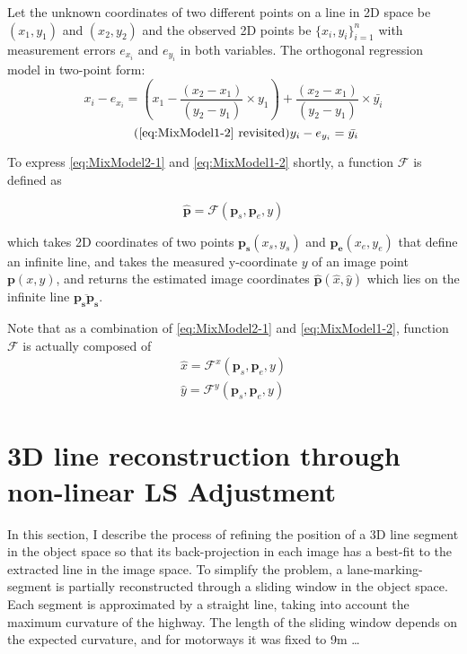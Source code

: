 Let the unknown coordinates of two different points on a line in 2D space be $(x_1,y_1)$ and $(x_2,y_2)$ and the observed 2D points be $\{x_i,y_i\}^n_{i=1}$ with measurement errors $e_{x_i}$ and $e_{y_i}$ in both variables. The orthogonal regression model in two-point form: 
\begin{equation} \label{eq:MixModel2-1}
x_i - e_{x_i}= (x_1-\dfrac{(x_2-x_1)}{(y_2-y_1)}\times y_1) + \dfrac{(x_2-x_1)}{(y_2-y_1)}\times \bar{y_i}
\end{equation}
\begin{equation} \tag{\ref{eq:MixModel1-2} revisited}
y_i-e_{y_i} = \bar{y_i}
\end{equation}

To express \eqref{eq:MixModel2-1} and \eqref{eq:MixModel1-2} shortly, a function $\mathcal{F}$ is defined as

\begin{equation} \label{eq:Ffunction}
\hat{\mathbf{p}} = \mathcal{F}(\mathbf{p}_s,\mathbf{p}_e,y)
\end{equation}

which takes 2D coordinates of two points $\mathbf{p_s}(x_s,y_s)$ and $\mathbf{p_e}(x_e,y_e)$ that define an infinite line, and takes the measured y-coordinate $y$ of an image point $\mathbf{p}(x,y)$, and returns the estimated image coordinates $\mathbf{\hat{p}}(\hat{x},\hat{y})$ which lies on the infinite line $\overline{\mathbf{p_s}\mathbf{p_s}}$.

Note that as a combination of \eqref{eq:MixModel2-1} and \eqref{eq:MixModel1-2}, function $\mathcal{F}$ is actually composed of
\begin{equation} \label{eq:Ffunction_xy}
\begin{split}
\hat{x} = \mathcal{F}^x(\mathbf{p}_s,\mathbf{p}_e,y)\\
\hat{y} = \mathcal{F}^y(\mathbf{p}_s,\mathbf{p}_e,y)
\end{split}
\end{equation}


\section{3D line reconstruction through non-linear LS Adjustment}
\label{sec:LSadj}

In this section, I describe the process of refining the position of a 3D line segment in the object space so that its back-projection in each image has a best-fit to the extracted line in the image space. To simplify the problem, a lane-marking-segment is partially reconstructed through a sliding window in the object space. Each segment is approximated by a straight line, taking into account the maximum curvature of the highway. 
The length of the sliding window depends on the expected curvature, and for motorways it was fixed to 9m …

